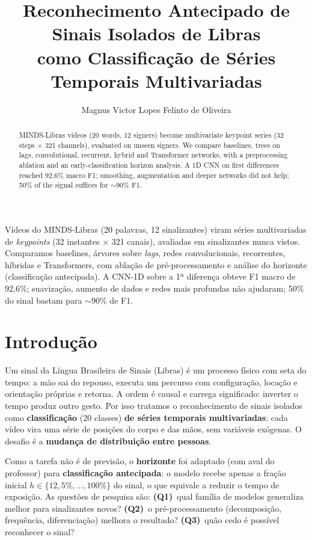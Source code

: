 \documentclass[12pt]{article}
\title{Reconhecimento Antecipado de Sinais Isolados de Libras\\
como Classificação de Séries Temporais Multivariadas}
\author{Magnus Victor Lopes Felinto de Oliveira\inst{1}}
\begin{document}
\renewcommand{\refname}{Referências}
\maketitle

\begin{resumo}
Vídeos do MINDS-Libras (20 palavras, 12 sinalizantes) viram séries multivariadas de \textit{keypoints} (32 instantes $\times$ 321 canais), avaliadas em sinalizantes nunca vistos. Comparamos baselines, árvores sobre \textit{lags}, redes convolucionais, recorrentes, híbridas e Transformers, com ablação de pré-processamento e análise do horizonte (classificação antecipada). A CNN-1D sobre a 1ª diferença obteve F1 macro de 92,6\%; suavização, aumento de dados e redes mais profundas não ajudaram; 50\% do sinal bastam para $\sim$90\% de F1.
\end{resumo}

\begin{abstract}
MINDS-Libras videos (20 words, 12 signers) become multivariate keypoint series (32 steps $\times$ 321 channels), evaluated on unseen signers. We compare baselines, trees on lags, convolutional, recurrent, hybrid and Transformer networks, with a preprocessing ablation and an early-classification horizon analysis. A 1D CNN on first differences reached 92.6\% macro F1; smoothing, augmentation and deeper networks did not help; 50\% of the signal suffices for $\sim$90\% F1.
\end{abstract}

\section{Introdução}

Um sinal da Língua Brasileira de Sinais (Libras) é um processo físico com seta do tempo: a mão sai do repouso, executa um percurso com configuração, locação e orientação próprias e retorna. A ordem é causal e carrega significado: inverter o tempo produz outro gesto. Por isso tratamos o reconhecimento de sinais isolados como \textbf{classificação} (20 classes) \textbf{de séries temporais multivariadas}: cada vídeo vira uma série de posições do corpo e das mãos, sem variáveis exógenas. O desafio é a \textbf{mudança de distribuição entre pessoas}.

Como a tarefa não é de previsão, o \textbf{horizonte} foi adaptado (com aval do professor) para \textbf{classificação antecipada}: o modelo recebe apenas a fração inicial $h \in \{12{,}5\%, \dots, 100\%\}$ do sinal, o que equivale a reduzir o tempo de exposição. As questões de pesquisa são: \textbf{(Q1)}~qual família de modelos generaliza melhor para sinalizantes novos? \textbf{(Q2)}~o pré-processamento (decomposição, frequência, diferenciação) melhora o resultado? \textbf{(Q3)}~quão cedo é possível reconhecer o sinal?
\end{document}
